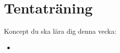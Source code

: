 \chapter{Tentaträning}\label{chapter:W14}
Koncept du ska lära dig denna vecka:
\begin{multicols}{2}\begin{itemize}[nosep,label={$\square$},leftmargin=*]
\item\end{itemize}\end{multicols}

